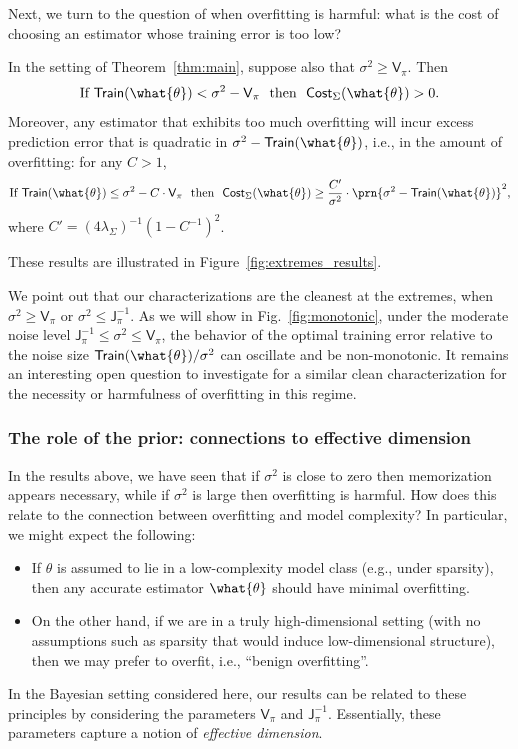 \documentclass[11pt]{article}
\newcommand{\trerr}{\mathsf{Train}}
\newcommand{\cost}{\mathsf{Cost}}
\newcommand{\jfunc}{\mathsf{J}}
\begin{document}
Next, we turn to the question of when overfitting is harmful: what is the cost of choosing an estimator whose training error is too low?
\begin{corollary}\label{cor:trerr_too_low__thm:main}
    In the setting of Theorem~\ref{thm:main}, suppose also that $\sigma^2 \geq \mathsf{V}_\pi$. Then
    \[\textnormal{If $\trerr(\what{\theta}) < \sigma^2 - \mathsf{V}_\pi$ \ then \ }\cost_\Sigma(\what{\theta})>0.\]
    Moreover, any estimator that exhibits too much overfitting will incur excess prediction error that is quadratic in $\sigma^2 - \trerr(\what{\theta})$, i.e., in the amount of overfitting: for any $C>1$,
    \[\textnormal{If $\trerr(\what{\theta}) \leq  \sigma^2 - C\cdot \mathsf{V}_\pi$ \ then \ }\cost_\Sigma(\what{\theta})\geq \frac{C'}{\sigma^2}\cdot \prn{\sigma^2 - \trerr(\what{\theta})}^2,\]
    where $C'=(4\lambda_\Sigma)^{-1}(1-C^{-1})^2$.
\end{corollary}



These results are illustrated in Figure~\ref{fig:extremes_results}.

\begin{remark}
    We point out that our characterizations are the cleanest at the extremes, when $\sigma^2 \geq \mathsf{V}_\pi$ or $\sigma^2 \leq \mathsf{J}_\pi^{-1}$. As we will show in Fig.~\ref{fig:monotonic}, under the moderate noise level $\mathsf{J}_\pi^{-1} \leq \sigma^2 \leq \mathsf{V}_\pi$, the behavior of the optimal training error relative to the noise size $\trerr(\what{\theta})/\sigma^2$ can oscillate and be non-monotonic. It remains an interesting open question to investigate for a similar clean characterization for the necessity or harmfulness of overfitting in this regime.
\end{remark}





\subsubsection{The role of the prior: connections to effective dimension}\label{sec:discuss_effective_dim}
In the results above, we have seen that if $\sigma^2$ is close to zero then memorization appears necessary, while if $\sigma^2$ is large then overfitting is harmful. How does this relate to the connection between overfitting and model complexity? In particular, we might expect the following:
\begin{itemize}
    \item If $\theta$ is assumed to lie in a low-complexity model class (e.g., under sparsity), then any accurate estimator $\what{\theta}$ should have minimal overfitting.
    \item On the other hand, if we are in a truly high-dimensional setting (with no assumptions such as sparsity that would induce low-dimensional structure), then we may prefer to overfit, i.e., ``benign overfitting''.
\end{itemize}
In the Bayesian setting considered here, our results can be related to these principles by considering the parameters $\mathsf{V}_\pi$ and $\jfunc_\pi^{-1}$. Essentially, these parameters capture a notion of \emph{effective dimension}.
\end{document}
